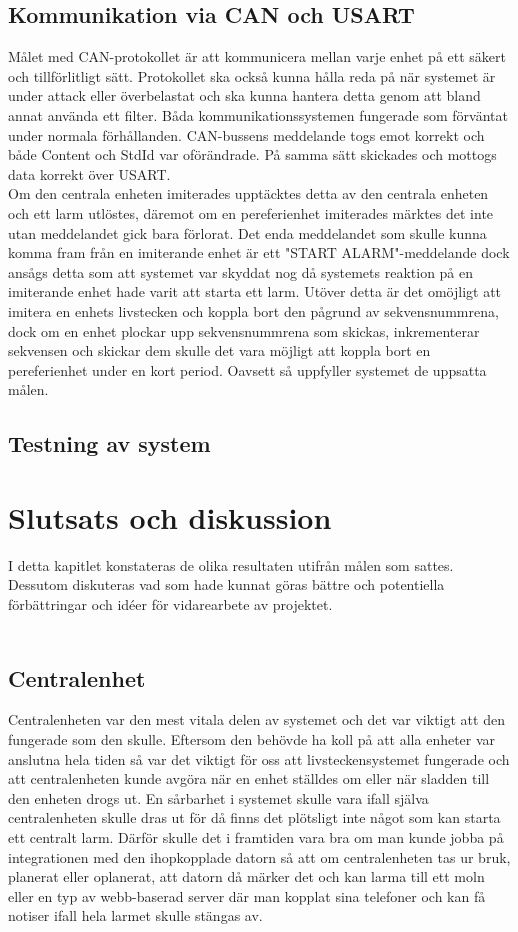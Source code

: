 \documentclass{article}
\begin{document}
\subsection{Kommunikation via CAN och USART}
Målet med CAN-protokollet är att kommunicera mellan varje enhet på ett säkert och tillförlitligt sätt. Protokollet ska också kunna hålla reda på när systemet är under attack eller överbelastat och ska kunna hantera detta genom att bland annat använda ett filter. Båda kommunikationssystemen fungerade som förväntat under normala förhållanden. CAN-bussens meddelande togs emot korrekt och både Content och StdId var oförändrade. På samma sätt skickades och mottogs data korrekt över USART. 
\\
Om den centrala enheten imiterades upptäcktes detta av den centrala enheten och ett larm utlöstes, däremot om en pereferienhet imiterades märktes det inte utan meddelandet gick bara förlorat. Det enda meddelandet som skulle kunna komma fram från en imiterande enhet är ett "START ALARM"-meddelande dock ansågs detta som att systemet var skyddat nog då systemets reaktion på en imiterande enhet hade varit att starta ett larm. Utöver detta är det omöjligt att imitera en enhets livstecken och koppla bort den pågrund av sekvensnummrena, dock om en enhet plockar upp sekvensnummrena som skickas, inkrementerar sekvensen och skickar dem skulle det vara möjligt att koppla bort en pereferienhet under en kort period. Oavsett så uppfyller systemet de uppsatta målen.

\subsection{Testning av system}

\section{Slutsats och diskussion}
I detta kapitlet konstateras de olika resultaten utifrån målen som sattes.
Dessutom diskuteras vad som hade kunnat göras bättre och potentiella förbättringar och idéer för vidarearbete av projektet.\\
\\
\subsection{Centralenhet}
Centralenheten var den mest vitala delen av systemet och det var viktigt att den fungerade som den skulle.
Eftersom den behövde ha koll på att alla enheter var anslutna hela tiden så var det viktigt för oss att livsteckensystemet fungerade och att centralenheten kunde avgöra när en enhet ställdes om eller när sladden till den enheten drogs ut.
En sårbarhet i systemet skulle vara ifall själva centralenheten skulle dras ut för då finns det plötsligt inte något som kan starta ett centralt larm. 
Därför skulle det i framtiden vara bra om man kunde jobba på integrationen med den ihopkopplade datorn så att om centralenheten tas ur bruk, planerat eller oplanerat, att datorn då märker det och kan larma till ett moln eller en typ av webb-baserad server där man kopplat sina telefoner och kan få notiser ifall hela larmet skulle stängas av.
\end{document}
